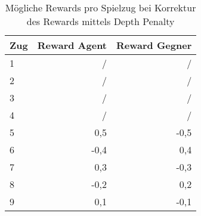 \begin{table}
\centering
\caption{Mögliche Rewards pro Spielzug bei Korrektur des Rewards mittels Depth Penalty}
\label{tab:reward_depth_penalty}
\begin{tabular}{lrr}
\toprule
 Zug   & Reward Agent  & Reward Gegner \\ \midrule
1      & /              & / \\
2      & /              & / \\
3      & /              & / \\
4      & /              & / \\
5      & 0,5            & -0,5\\
6      & -0,4           & 0,4 \\
7      & 0,3            & -0,3\\
8      & -0,2           & 0,2 \\
9      & 0,1            & -0,1 \\ \bottomrule
\end{tabular}
\end{table}
